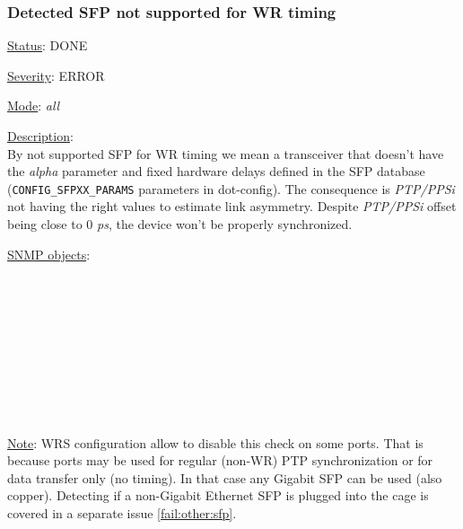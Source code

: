 \subsubsection{\bf Detected SFP not supported for WR timing}
		\label{fail:timing:wrong_sfp}
		\begin{pck_descr}
			\item [] \underline{Status}: DONE
			\item [] \underline{Severity}: ERROR
			\item [] \underline{Mode}: \emph{all}
			\item [] \underline{Description}:\\
				By not supported SFP for WR timing we mean a transceiver that doesn't
				have the \emph{alpha} parameter and fixed hardware delays defined in the
				SFP database (\texttt{CONFIG\_SFPXX\_PARAMS} parameters in dot-config). The consequence is
				\emph{PTP/PPSi} not having the right values to estimate link asymmetry.
				Despite \emph{PTP/PPSi} offset being close to 0 \emph{ps}, the device won't
				be properly synchronized.
			\item [] \underline{SNMP objects}:\\
				\\
				\\
				\\
				\\
				\\
				\\
				\\
				\\
				\\
			\item [] \underline{Note}: WRS configuration allow to disable this check on some ports.
				That is because ports may be used for regular (non-WR) PTP
				synchronization or for data transfer only (no timing). In that case any
				Gigabit SFP can be used (also copper). Detecting if a non-Gigabit
				Ethernet SFP is plugged into the cage is covered in a separate issue
				\ref{fail:other:sfp}.
		\end{pck_descr}


